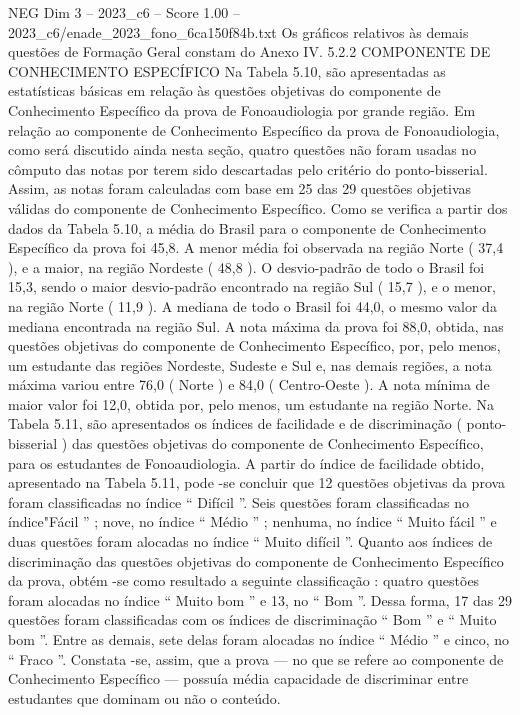 \begin{textsample}{NEG Dim 3 – 2023\_c6 – Score 1.00 – 2023\_c6/enade\_2023\_fono\_6ca150f84b.txt}
Os gráficos relativos às demais questões de Formação Geral constam do Anexo IV. 5.2.2 COMPONENTE DE CONHECIMENTO ESPECÍFICO Na Tabela 5.10, são apresentadas as estatísticas básicas em relação às questões objetivas do componente de Conhecimento Específico da prova de Fonoaudiologia por grande região.
Em relação ao componente de Conhecimento Específico da prova de Fonoaudiologia, como será discutido ainda nesta seção, quatro questões não foram usadas no cômputo das notas por terem sido descartadas pelo critério do ponto-bisserial.
Assim, as notas foram calculadas com base em 25 das 29 questões objetivas válidas do componente de Conhecimento Específico.
Como se verifica a partir dos dados da Tabela 5.10, a média do Brasil para o componente de Conhecimento Específico da prova foi 45,8.
A menor média foi observada na região Norte ( 37,4 ), e a maior, na região Nordeste ( 48,8 ).
O desvio-padrão de todo o Brasil foi 15,3, sendo o maior desvio-padrão encontrado na região Sul ( 15,7 ), e o menor, na região Norte ( 11,9 ).
A mediana de todo o Brasil foi 44,0, o mesmo valor da mediana encontrada na região Sul.
A nota máxima da prova foi 88,0, obtida, nas questões objetivas do componente de Conhecimento Específico, por, pelo menos, um estudante das regiões Nordeste, Sudeste e Sul e, nas demais regiões, a nota máxima variou entre 76,0 ( Norte ) e 84,0 ( Centro-Oeste ).
A nota mínima de maior valor foi 12,0, obtida por, pelo menos, um estudante na região Norte.
Na Tabela 5.11, são apresentados os índices de facilidade e de discriminação ( ponto-bisserial ) das questões objetivas do componente de Conhecimento Específico, para os estudantes de Fonoaudiologia.
A partir do índice de facilidade obtido, apresentado na Tabela 5.11, pode -se concluir que 12 questões objetivas da prova foram classificadas no índice “ Difícil ”.
Seis questões foram classificadas no índice"Fácil ” ; nove, no índice “ Médio ” ; nenhuma, no índice “ Muito fácil ” e duas questões foram alocadas no índice “ Muito difícil ”.
Quanto aos índices de discriminação das questões objetivas do componente de Conhecimento Específico da prova, obtém -se como resultado a seguinte classificação : quatro questões foram alocadas no índice “ Muito bom ” e 13, no “ Bom ”.
Dessa forma, 17 das 29 questões foram classificadas com os índices de discriminação “ Bom ” e “ Muito bom ”.
Entre as demais, sete delas foram alocadas no índice “ Médio ” e cinco, no “ Fraco ”.
Constata -se, assim, que a prova — no que se refere ao componente de Conhecimento Específico — possuía média capacidade de discriminar entre estudantes que dominam ou não o conteúdo.

\end{textsample}
